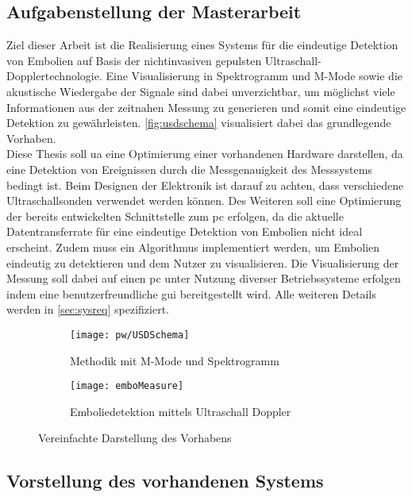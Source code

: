 \subsection{Aufgabenstellung der Masterarbeit}
Ziel dieser Arbeit ist die Realisierung eines Systems für die eindeutige Detektion von Embolien auf Basis der nichtinvasiven gepulsten Ultraschall-Dopplertechnologie. Eine Visualisierung in Spektrogramm und M-Mode sowie die akustische Wiedergabe der Signale sind dabei unverzichtbar, um möglichst viele Informationen aus der zeitnahen Messung zu generieren und somit eine eindeutige Detektion zu gewährleisten. \autoref{fig:usdschema} visualisiert dabei das grundlegende Vorhaben.\\
Diese Thesis soll \ac{ua} eine Optimierung einer vorhandenen Hardware darstellen, da eine Detektion von Ereignissen durch die Messgenauigkeit des Messsystems bedingt ist. Beim Designen der Elektronik ist darauf zu achten, dass verschiedene Ultraschallsonden verwendet werden können. Des Weiteren soll eine Optimierung der bereits entwickelten Schnittstelle zum \ac{pc} erfolgen, da die aktuelle Datentransferrate für eine eindeutige Detektion von Embolien nicht ideal erscheint. Zudem muss ein Algorithmus implementiert werden, um Embolien eindeutig zu detektieren und dem Nutzer zu visualisieren. Die Visualisierung der Messung soll dabei auf einen \ac{pc} unter Nutzung diverser Betriebssysteme erfolgen indem eine benutzerfreundliche \ac{gui} bereitgestellt wird. Alle weiteren Details werden in \autoref{sec:sysreq} spezifiziert.
\begin{figure}[ht]
	\centering
	\begin{subfigure}[b]{0.49\textwidth}
		\centering
  		\texttt{[image: pw/USDSchema]}  
		\caption{Methodik mit M-Mode und Spektrogramm}
  	\end{subfigure}
  	\hfill
  	\begin{subfigure}[b]{0.49\textwidth}
	  	\centering
  		\texttt{[image: emboMeasure]}
	  	\caption{Emboliedetektion mittels Ultraschall Doppler}
  	\end{subfigure}
	\caption{Vereinfachte Darstellung des Vorhabens}
  	\label{fig:usdschema}
\end{figure}
%
%
%

\subsection{Vorstellung des vorhandenen Systems}
